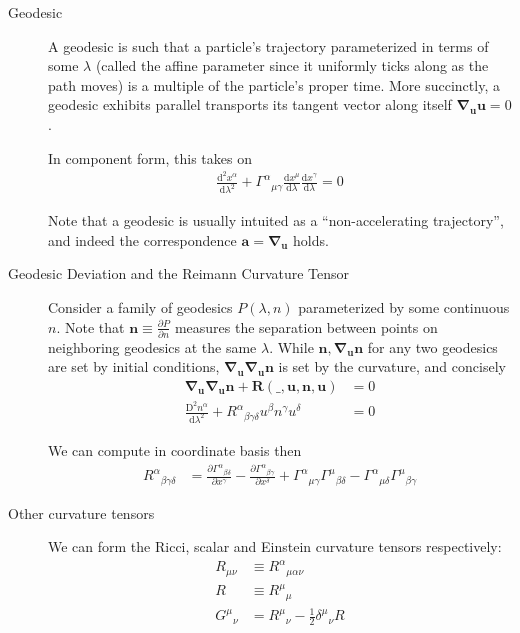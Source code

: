 \documentclass[12pt]{report}
\newcommand{\rd}[2]{\frac{\mathrm{d}#1}{\mathrm{d}#2}}
\newcommand{\pd}[2]{\frac{\partial#1}{\partial#2}}
\newcommand{\rtd}[2]{\frac{\mathrm{d}^2#1}{\mathrm{d}#2^2}}
\newcommand{\bm}[1]{\boldsymbol{\mathbf{#1}}}
\begin{document}
\begin{description}
    \item[Geodesic] A geodesic is such that a particle's trajectory
        parameterized in terms of some $\lambda$ (called the affine parameter
        since it uniformly ticks along as the path moves) is a multiple of the
        particle's proper time. More succinctly, a geodesic exhibits parallel
        transports its tangent vector along itself $\bm{\nabla}_{\bm{u}}\bm{u} =
        0$.

        In component form, this takes on
        \begin{align}
            \rtd{x^\alpha}{\lambda} + {\Gamma^\alpha}_{\mu\gamma}
                \rd{x^\mu}{\lambda}\rd{x^\gamma}{\lambda} = 0
        \end{align}

        Note that a geodesic is usually intuited as a ``non-accelerating
        trajectory'', and indeed the correspondence $\bm{a} =
        \bm{\nabla}_{\bm{u}}$ holds.

    \item[Geodesic Deviation and the Reimann Curvature Tensor] Consider a family
        of geodesics $P(\lambda, n)$ parameterized by some continuous $n$. Note
        that $\bm{n} \equiv \pd{P}{n}$ measures the separation between points on
        neighboring geodesics at the same $\lambda$. While $\bm{n},
        \bm{\nabla}_{\bm{u}}\bm{n}$ for any two geodesics are set by initial
        conditions, $\bm{\nabla}_{\bm{u}}\bm{\nabla}_{\bm{u}} \bm{n}$ is set by
        the curvature, and concisely
        \begin{align}
            \bm{\nabla}_{\bm{u}}\bm{\nabla}_{\bm{u}} \bm{n} + \bm{R}
                (\_, \bm{u}, \bm{n}, \bm{u}) &= 0\\
            \frac{\mathrm{D}^2 n^\alpha}{\mathrm{d}\lambda^2} +
                {R^\alpha}_{\beta\gamma\delta} u^\beta n^\gamma u^\delta &= 0
        \end{align}

        We can compute in coordinate basis then
        \begin{align}
            {R^\alpha}_{\beta\gamma\delta} &=
                \pd{{\Gamma^\alpha}_{\beta\delta}}{x^\gamma} -
                \pd{{\Gamma^\alpha}_{\beta\gamma}}{x^\delta} +
                {\Gamma^\alpha}_{\mu\gamma} {\Gamma^\mu}_{\beta\delta} -
                {\Gamma^\alpha}_{\mu\delta} {\Gamma^\mu}_{\beta\gamma}
                \label{8.Reimann}
        \end{align}

    \item[Other curvature tensors] We can form the Ricci, scalar and Einstein
        curvature tensors respectively:
        \begin{align}
            R_{\mu\nu} &\equiv {R^\alpha}_{\mu\alpha\nu}\\
            R &\equiv {R^\mu}_\mu\\
            {G^\mu}_{\nu} &= {R^\mu}_{\nu} - \frac{1}{2} {\delta^\mu}_\nu R
        \end{align}


\end{description}
\end{document}
